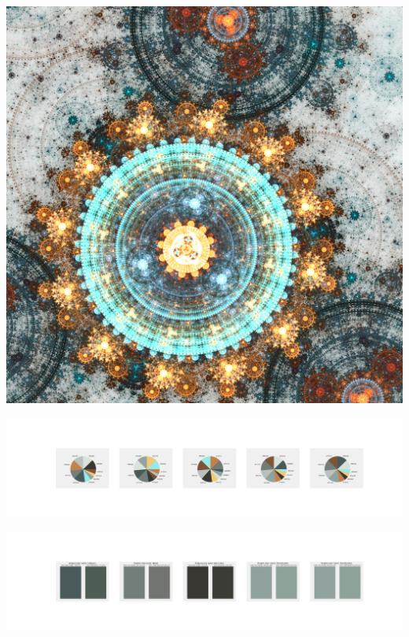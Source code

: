 \documentclass[11pt]{article}
\begin{document}
\begin{landscape}
    \begin{center}
    \includegraphics[width=\textwidth]{./nbimg/file (187).jpg}
    \end{center}

    \begin{center}
    \includegraphics[width=250mm]{./nbimg/pie-97.jpg}
    \end{center}

    \begin{center}
    \includegraphics[width=250mm]{./nbimg/peak-97.jpg}
    \end{center}
    


\end{landscape}
\end{document}
